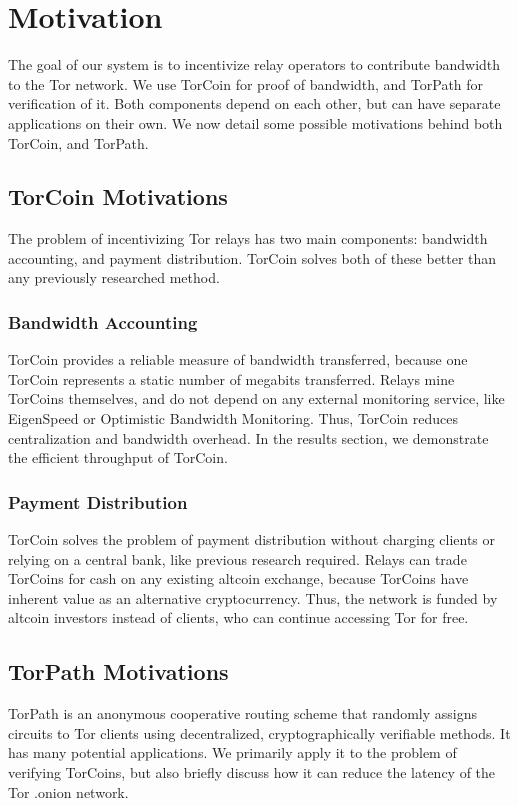 \section{Motivation} \label{motivation}

The goal of our system is to incentivize relay operators to contribute bandwidth to the Tor network. We use TorCoin for proof of bandwidth, and TorPath for verification of it. Both components depend on each other, but can have separate applications on their own. We now detail some possible motivations behind both TorCoin, and TorPath.

\subsection{TorCoin Motivations}

The problem of incentivizing Tor relays has two main components: bandwidth accounting, and payment distribution. TorCoin solves both of these better than any previously researched method.

\subsubsection{Bandwidth Accounting}

TorCoin provides a reliable measure of bandwidth transferred, because one TorCoin represents a static number of megabits transferred. Relays mine TorCoins themselves, and do not depend on any external monitoring service, like EigenSpeed \cite{jansen2013lira} or Optimistic Bandwidth Monitoring. \cite{snader2008tune} Thus, TorCoin reduces centralization and bandwidth overhead. In the results section, we demonstrate the efficient throughput of TorCoin.

\subsubsection{Payment Distribution}
TorCoin solves the problem of payment distribution without charging clients or relying on a central bank, like previous research required. \cite{jansen2013lira} Relays can trade TorCoins for cash on any existing altcoin exchange, because TorCoins have inherent value as an alternative cryptocurrency. Thus, the network is funded by altcoin investors instead of clients, who can continue accessing Tor for free.

\subsection{TorPath Motivations}
TorPath is an anonymous cooperative routing scheme that randomly assigns circuits to Tor clients using decentralized, cryptographically verifiable methods. It has many potential applications. We primarily apply it to the problem of verifying TorCoins, but also briefly discuss how it can reduce the latency of the Tor .onion network.

